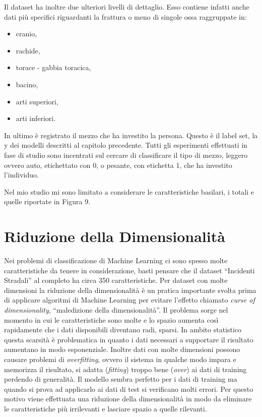 \documentclass[12pt,italian]{report}
\begin{document}
Il dataset ha inoltre due ulteriori livelli di dettaglio. Esso contiene infatti anche dati più specifici riguardanti la frattura o meno di singole ossa raggruppate in:
\begin{itemize}
	\item cranio,
	\item rachide,
	\item torace - gabbia toracica,
	\item bacino,
	\item arti superiori,
	\item arti inferiori.
\end{itemize}
In ultimo è registrato il mezzo che ha investito la persona. Questo è il label set, la y dei modelli descritti al capitolo precedente. Tutti gli esperimenti effettuati in fase di studio sono incentrati sul cercare di classificare il tipo di mezzo, leggero ovvero auto, etichettato con 0, o pesante, con etichetta 1, che ha investito l'individuo.

Nel mio studio mi sono limitato a considerare le caratteristiche basilari, i totali e quelle riportate in Figura 9.
\section{Riduzione della Dimensionalità}
\label{sec:riduzione}
Nei problemi di classificazione di Machine Learning ci sono spesso molte caratteristiche da tenere in considerazione, basti pensare che il dataset ``Incidenti Stradali'' al completo ha circa 350 caratteristiche. Per dataset con molte dimensioni la riduzione della dimensionalità è un pratica importante svolta prima di applicare algoritmi di Machine Learning per evitare l'effetto chiamato \textit{curse of dimensionality}, ``maledizione della dimensionalità''\cite{shalevshwartz2014understanding}. Il problema sorge nel momento in cui le caratteristiche sono molte e lo spazio aumenta così rapidamente che i dati disponibili diventano radi, sparsi. In ambito statistico questa scarsità è problematica in quanto i dati necessari a supportare il risultato aumentano in modo esponenziale.
Inoltre dati con molte dimensioni possono causare problemi di \textit{overfitting}, ovvero il sistema in qualche modo impara e memorizza il risultato, si adatta (\textit{fitting}) troppo bene (\textit{over}) ai dati di training perdendo di generalità. Il modello sembra perfetto per i dati di training ma quando si prova ad applicarlo ai dati di test si verificano molti errori.
Per questo motivo viene effettuata una riduzione della dimensionalità in modo da eliminare le caratteristiche più irrilevanti e lasciare spazio a quelle rilevanti. 
\end{document}
